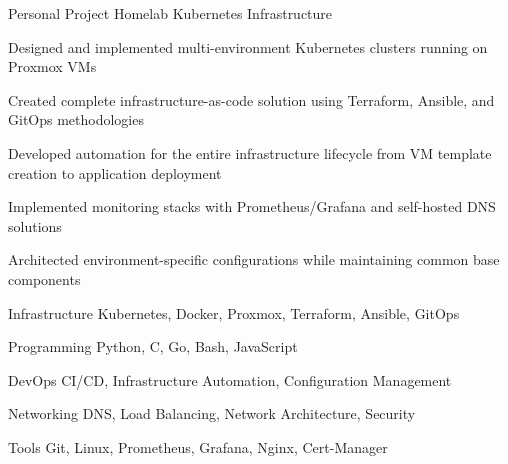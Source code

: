 \documentclass[11pt, letterpaper]{awesome-cv}
\begin{document}

\begin{cventries}

\cventry
    {Personal Project}
    {Homelab Kubernetes Infrastructure \href{https://github.com/sfcal/homelab}{\faGithub}}
    {}
    {}
    {
      \begin{cvitems}
        \item {Designed and implemented multi-environment Kubernetes clusters running on Proxmox VMs}
        \item {Created complete infrastructure-as-code solution using Terraform, Ansible, and GitOps methodologies}
        \item {Developed automation for the entire infrastructure lifecycle from VM template creation to application deployment}
        \item {Implemented monitoring stacks with Prometheus/Grafana and self-hosted DNS solutions}
        \item {Architected environment-specific configurations while maintaining common base components}
      \end{cvitems}
    }

\end{cventries}


\begin{cvskills}

  \cvskill
    {Infrastructure}
    {Kubernetes, Docker, Proxmox, Terraform, Ansible, GitOps}

  \cvskill
    {Programming}
    {Python, C, Go, Bash, JavaScript}

  \cvskill
    {DevOps}
    {CI/CD, Infrastructure Automation, Configuration Management}

  \cvskill
    {Networking}
    {DNS, Load Balancing, Network Architecture, Security}

  \cvskill
    {Tools}
    {Git, Linux, Prometheus, Grafana, Nginx, Cert-Manager}

\end{cvskills}
\end{document}
